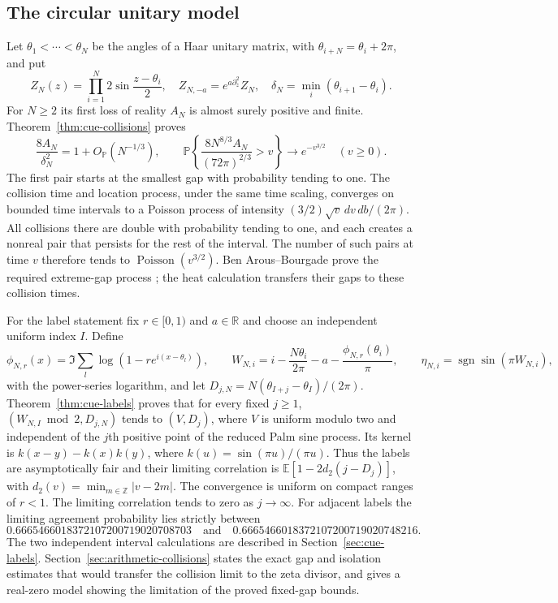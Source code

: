 \subsection{The circular unitary model}
Let $\theta_1<\cdots<\theta_N$ be the angles of a Haar unitary
matrix, with $\theta_{i+N}=\theta_i+2\pi$, and put
\[
 Z_N(z)=\prod_{i=1}^N2\sin\frac{z-\theta_i}{2},\quad
 Z_{N,-a}=e^{a\partial_z^2}Z_N,
 \quad \delta_N=\min_i(\theta_{i+1}-\theta_i).
\]
For $N\ge2$ its first loss of reality $A_N$ is almost surely
positive and finite. Theorem~\ref{thm:cue-collisions} proves
\[
 \frac{8A_N}{\delta_N^2}=1+O_{\mathbb P}(N^{-1/3}),\qquad
 \mathbb P\left\{\frac{8N^{8/3}A_N}{(72\pi)^{2/3}}>v\right\}
                 \longrightarrow e^{-v^{3/2}}\quad(v\ge0).
\]
The first pair starts at the smallest gap with probability tending
to one. The collision time and location process, under the same
time scaling, converges on bounded time intervals to a Poisson
process of intensity $(3/2)\sqrt v\,dv\,db/(2\pi)$.
All collisions there are double with probability tending to one,
and each creates a nonreal pair that persists for the rest of the
interval. The number of such pairs at time $v$ therefore tends to
$\operatorname{Poisson}(v^{3/2})$.
Ben Arous--Bourgade prove the required extreme-gap process
\cite[Theorem~1.1 and Corollary~1.2, pp.~2650--2651]{ben-arous-bourgade};
the heat calculation transfers their gaps to these collision times.

For the label statement fix $r\in[0,1)$ and $a\in\mathbb R$ and
choose an independent uniform index $I$. Define
\[
 \phi_{N,r}(x)=\Im\sum_l\log(1-re^{i(x-\theta_l)}),\qquad
 W_{N,i}=i-\frac{N\theta_i}{2\pi}-a-\frac{\phi_{N,r}(\theta_i)}\pi,
 \qquad \eta_{N,i}=\operatorname{sgn}\sin(\pi W_{N,i}),
\]
with the power-series logarithm, and let
$D_{j,N}=N(\theta_{I+j}-\theta_I)/(2\pi)$.
Theorem~\ref{thm:cue-labels} proves that for every fixed $j\ge1$,
$(W_{N,I}\bmod2,D_{j,N})$ tends to $(V,D_j)$, where $V$ is
uniform modulo two and independent of the $j$th positive point of
the reduced Palm sine process. Its kernel is
$k(x-y)-k(x)k(y)$, where $k(u)=\sin(\pi u)/(\pi u)$.
Thus the labels are asymptotically fair and their limiting
correlation is
$\mathbb E[1-2d_2(j-D_j)]$, with
$d_2(v)=\min_{m\in\mathbb Z}|v-2m|$.
The convergence is uniform on compact ranges of $r<1$.
The limiting correlation tends to zero as $j\to\infty$.
For adjacent labels the limiting agreement probability lies strictly
between
\[
 0.6665466018372107200719020708703
 \quad\text{and}\quad
 0.6665466018372107200719020748216.
\]
The two independent interval calculations are described in
Section~\ref{sec:cue-labels}.
Section~\ref{sec:arithmetic-collisions} states the exact gap and
isolation estimates that would transfer the collision limit to the
zeta divisor, and gives a real-zero model showing the limitation of
the proved fixed-gap bounds.

